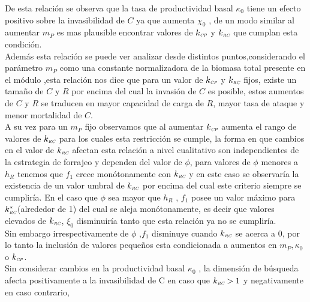 De esta relaci\'on se observa que la tasa de productividad basal $\kappa_0$ tiene un efecto positivo sobre la invasibilidad de $C$ ya que aumenta $\chi_0$ , de un modo similar al aumentar $m_P$ es mas plausible encontrar valores de $k_{\textit{\tiny CP}}$ y $k_{\textit{\tiny RC}}$ que cumplan esta condici\'on. \\
Adem\'as esta relaci\'on se puede ver analizar desde distintos puntos,considerando el par\'ametro $m_P$ como una constante normalizadora de la biomasa total presente en el m\'odulo ,esta relaci\'on nos dice que para un valor de $k_{\textit{\tiny CP}}$ y $k_{\textit{\tiny RC}}$ fijos, existe un tama\~no  de $C$ y $R$ por encima del cual la invasi\'on de $C$ es posible, estos aumentos de $C$ y $R$ se traducen en mayor capacidad de carga de $R$, mayor tasa de ataque y menor mortalidad de $C$.\\
A su vez para un $m_P$ fijo observamos que al aumentar $k_{\textit{\tiny CP}}$ aumenta el rango de valores de $k_{\textit{\tiny RC}}$ para los cuales esta restricci\'on se cumple, la forma en que cambios en el valor de $k_{\textit{\tiny RC}}$ afectan esta relaci\'on a nivel cualitativo son independientes de la estrategia de forrajeo y dependen del valor de $\phi$, para valores de $\phi$  menores a $h_R$ tenemos que $f_1$ crece mon\'otonamente con $k_{\textit{\tiny RC}}$ y en este caso se observar\'ia la existencia de un valor umbral de $k_{\textit{\tiny RC}}$ por encima del cual este criterio siempre se cumplir\'ia. En el caso que $ \phi$ sea mayor que $h_R$ , $f_1$ posee un valor m\'aximo para $k_{\textit{\tiny RC}}^*$(alrededor de 1) del cual se aleja mon\'otonamente, es decir que valores elevados de $k_{\textit{\tiny RC}}$, $\xi_0$ disminuir\'ia tanto que esta relaci\'on ya no se cumplir\'ia.\\ Sin embargo irrespectivamente de $\phi$ ,$f_1$ disminuye cuando $k_{\textit{\tiny RC}}$ se acerca a 0, por lo tanto la inclusi\'on de valores peque\~nos esta condicionada a aumentos en $m_P, \kappa_0$ o $k_{\textit{\tiny CP}}$.\\

Sin considerar cambios en la productividad basal $\kappa_0$ , la dimensi\'on de b\'usqueda afecta positivamente a la invasibilidad de C en caso que $k_{\textit{\tiny RC}} > 1$ y negativamente en caso contrario, 


